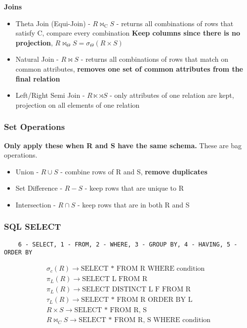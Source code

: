\documentclass[9pt]{extarticle}
\begin{document}
\textbf{Joins}
\begin{itemize}
    \item Theta Join (Equi-Join) - $R \bowtie_{\text{C}} S$ - returns all 
    combinations of rows that satisfy C, compare every combination \textbf{Keep
    columns since there is no projection}, $R \bowtie_{\Theta} S = 
    \sigma_{\Theta}(R \times S)$
    \item Natural Join - $R \bowtie S$ - returns all combinations of rows that
    match on common attributes, \textbf{removes one set of common attributes
    from the final relation}
    \item Left/Right Semi Join - $R \ltimes \rtimes S$ - only attributes of one 
    relation
    are kept, projection on all elements of one relation
\end{itemize}

\subsubsection*{Set Operations}
\textbf{Only apply these when R and S have the same schema.} These are bag
operations.
\begin{itemize}
    \item Union - $R \cup S$ - combine rows of R and S, 
    \textbf{remove duplicates}
    \item Set Difference - $R - S$ - keep rows that are unique to R
    \item Intersection - $R \cap S$ - keep rows that are in both R and S
\end{itemize}

\subsubsection*{SQL SELECT}
\begin{verbatim}
    6 - SELECT, 1 - FROM, 2 - WHERE, 3 - GROUP BY, 4 - HAVING, 5 - ORDER BY
\end{verbatim}
\begin{gather*}
    \sigma_c(R) \rightarrow \text{SELECT * FROM R WHERE condition} \\
    \pi_L(R) \rightarrow \text{SELECT L FROM R} \\
    \pi_L(R) \rightarrow \text{SELECT DISTINCT L F FROM R} \\
    \tau_L(R) \rightarrow \text{SELECT * FROM R ORDER BY L} \\
    R \times S \rightarrow \text{SELECT * FROM R, S} \\
    R \bowtie_C S \rightarrow \text{SELECT * FROM R, S WHERE condition} \\
\end{gather*}
\end{document}
